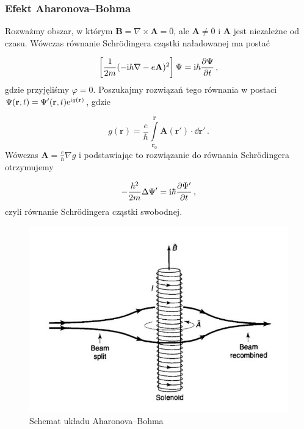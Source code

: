 \documentclass{myclass}
\begin{document}
\subsubsection{Efekt Aharonova--Bohma}

Rozważmy obszar, w którym \(\mathbf{B}=\nabla\times\mathbf{A}=\overline{0}\), ale
\(\mathbf{A}\neq\overline{0}\) i \(\mathbf{A}\) jest niezależne od czasu. Wówczas równanie
Schr{\"o}dingera cząstki naładowanej ma postać

\begin{equation*}
\left[\frac{1}{2m}(-\mathrm{i}\hbar\nabla-e\mathbf{A})^2\right]\Psi=\mathrm{i}\hbar\pdv{\Psi}{t}\,,
\end{equation*}
gdzie przyjęliśmy \(\varphi= 0\). Poszukajmy rozwiązań tego równania w postaci
\(\Psi(\mathbf{r},t)=\Psi'(\mathbf{r},t)\mathrm{e}^{\mathrm{i} g(\mathbf{r})}\), gdzie

\begin{equation*}
g(\mathbf{r})=\frac{e}{\hbar}\int\limits_{\mathbf{r}_0}^\mathbf{r}\mathbf{A}(\mathbf{r}')\cdot\dd{\mathbf{r}'}\,.
\end{equation*}
Wówczas \(\mathbf{A}=\frac{e}{\hbar}\nabla g\) i podstawiając to rozwiązanie do równania
Schr{\"o}dingera otrzymujemy

\begin{equation*}
-\frac{\hbar^2}{2m}\Delta\Psi'=\mathrm{i}\hbar\pdv{\Psi'}{t}\,,
\end{equation*}
czyli równanie Schr{\"o}dingera cząstki swobodnej. 

\begin{figure}[ht]
    \centering
    \includegraphics[scale=0.3]{figs/aharonov-bohm-diagram.jpg}
    \caption{Schemat układu Aharonova--Bohma}
    \label{aharonov-bohm}
\end{figure}
\end{document}
